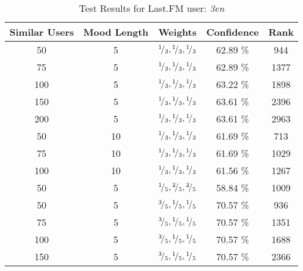 \begin{table}[h!]
\centering
\begin{tabular}{ | c | c | c || c | c | }
\hline
Similar Users	& Mood Length	& Weights							&Confidence	&Rank\\
\hline \hline
50			& 5			& \({}^{1}\!/_{3}, {}^{1}\!/_{3}, {}^{1}\!/_{3}\)	&62.89 \%		&944\\
\hline
75			& 5			& \({}^{1}\!/_{3}, {}^{1}\!/_{3}, {}^{1}\!/_{3}\)	&62.89 \%		&1377\\
\hline
100			& 5			& \({}^{1}\!/_{3}, {}^{1}\!/_{3}, {}^{1}\!/_{3}\)	&63.22 \%		&1898\\
\hline
150			& 5			& \({}^{1}\!/_{3}, {}^{1}\!/_{3}, {}^{1}\!/_{3}\)	&63.61 \%		&2396\\
\hline
200			& 5			& \({}^{1}\!/_{3}, {}^{1}\!/_{3}, {}^{1}\!/_{3}\)	&63.61 \%		&2963\\
\hline
50			& 10			& \({}^{1}\!/_{3}, {}^{1}\!/_{3}, {}^{1}\!/_{3}\)	&61.69 \%		&713\\
\hline
75			& 10			& \({}^{1}\!/_{3}, {}^{1}\!/_{3}, {}^{1}\!/_{3}\)	&61.69 \%		&1029\\
\hline
100			& 10			& \({}^{1}\!/_{3}, {}^{1}\!/_{3}, {}^{1}\!/_{3}\)	&61.56 \%		&1267\\
\hline
50			& 5			& \({}^{1}\!/_{5}, {}^{2}\!/_{5}, {}^{2}\!/_{5}\)	&58.84 \%		&1009\\
\hline
50			& 5			& \({}^{3}\!/_{5}, {}^{1}\!/_{5}, {}^{1}\!/_{5}\)	&70.57 \%		&936\\
\hline
75			& 5			& \({}^{3}\!/_{5}, {}^{1}\!/_{5}, {}^{1}\!/_{5}\)	&70.57 \%		&1351\\
\hline
100			& 5			& \({}^{3}\!/_{5}, {}^{1}\!/_{5}, {}^{1}\!/_{5}\)	&70.57 \%		&1688\\
\hline
150			& 5			& \({}^{3}\!/_{5}, {}^{1}\!/_{5}, {}^{1}\!/_{5}\)	&70.57 \%		&2366\\
\hline
\end{tabular}
\caption{Test Results for Last.FM user: \emph{3en}}
\label{table:test_results_3en}
\end{table}

